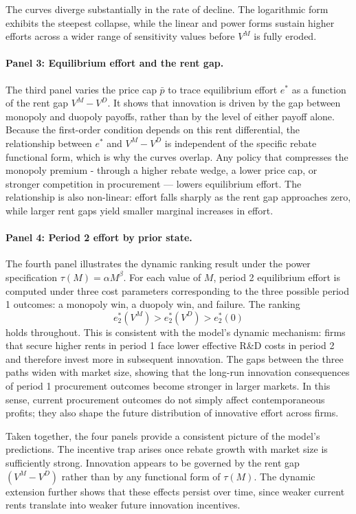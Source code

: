 \documentclass[12pt]{article}
\begin{document}
The curves diverge substantially in the rate of decline. The logarithmic form exhibits the steepest collapse, while the linear and power forms sustain higher efforts across a wider range of sensitivity values before $V^M$ is fully eroded. 

\paragraph{Panel 3: Equilibrium effort and the rent gap.}
The third panel varies the price cap $\bar{p}$ to trace equilibrium effort $e^*$ as a function of the rent gap $V^M - V^D$. It shows that innovation is driven by the gap between monopoly and duopoly payoffs, rather than by the level of either payoff alone. Because the first-order condition depends on this rent differential, the relationship between $e^*$ and $V^M - V^D$ is independent of the specific rebate functional form, which is why the curves overlap. Any policy that compresses the monopoly premium - through a higher rebate wedge, a lower price cap, or stronger competition in procurement — lowers equilibrium effort. The relationship is also non-linear: effort falls sharply as the rent gap approaches zero, while larger rent gaps yield smaller marginal increases in effort.

\paragraph{Panel 4: Period 2 effort by prior state.}
The fourth panel illustrates the dynamic ranking result under the power specification $\tau(M)=\alpha M^{\beta}$. For each value of $M$, period 2 equilibrium effort is computed under three cost parameters corresponding to the three possible period 1 outcomes: a monopoly win, a duopoly win, and failure. The ranking
\[
e_2^*(V^M) > e_2^*(V^D) > e_2^*(0)
\]
holds throughout. This is consistent with the model's dynamic mechanism: firms that secure higher rents in period 1 face lower effective R\&D costs in period 2 and therefore invest more in subsequent innovation. The gaps between the three paths widen with market size, showing that the long-run innovation consequences of period 1 procurement outcomes become stronger in larger markets. In this sense, current procurement outcomes do not simply affect contemporaneous profits; they also shape the future distribution of innovative effort across firms.

Taken together, the four panels provide a consistent picture of the model's predictions. The incentive trap arises once rebate growth with market size is sufficiently strong. Innovation appears to be governed by the rent gap $(V^M - V^D)$ rather than by any functional form of $\tau(M)$. The dynamic extension further shows that these effects persist over time, since weaker current rents translate into weaker future innovation incentives.
\end{document}
